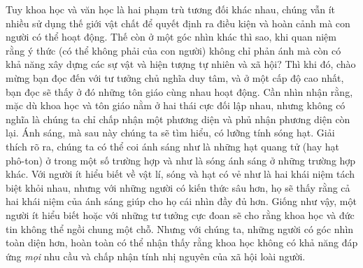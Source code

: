 Tuy khoa học và văn học là hai phạm trù tương đối khác nhau, chúng vẫn ít nhiều sử dụng thế giới vật chất để quyết định ra điều kiện và hoàn cảnh mà con người có thể hoạt động. Thế còn ở một góc nhìn khác thì sao, khi quan niệm rằng ý thức (có thể không phải của con người) không chỉ phản ánh mà còn có khả năng xây dựng các sự vật và hiện tượng tự nhiên và xã hội? Thì khi đó, chào mừng bạn đọc đến với tư tưởng chủ nghĩa duy tâm, và ở một cấp độ cao nhất, bạn đọc sẽ thấy ở đó những tôn giáo cùng nhau hoạt động. Cần nhìn nhận rằng, mặc dù khoa học và tôn giáo nằm ở hai thái cực đối lập nhau, nhưng không có nghĩa là chúng ta chỉ chấp nhận một phương diện và phủ nhận phương diện còn lại. Ánh sáng, mà sau này chúng ta sẽ tìm hiểu, có lưỡng tính sóng hạt. Giải thích rõ ra, chúng ta có thể coi ánh sáng như là những hạt quang tử (hay hạt phô-ton) ở trong một số trường hợp và như là sóng ánh sáng ở những trường hợp khác. Với người ít hiểu biết về vật lí, sóng và hạt có vẻ như là hai khái niệm tách biệt khỏi nhau, nhưng với những người có kiến thức sâu hơn, họ sẽ thấy rằng cả hai khái niệm của ánh sáng giúp cho họ cái nhìn đầy đủ hơn. Giống như vậy, một người ít hiểu biết hoặc với những tư tưởng cực đoan sẽ cho rằng khoa học và đức tin không thể ngồi chung một chỗ. Nhưng với chúng ta, những người có góc nhìn toàn diện hơn, hoàn toàn có thể nhận thấy rằng khoa học không có khả năng đáp ứng \emph{mọi} nhu cầu và chấp nhận tính nhị nguyên của xã hội loài người.